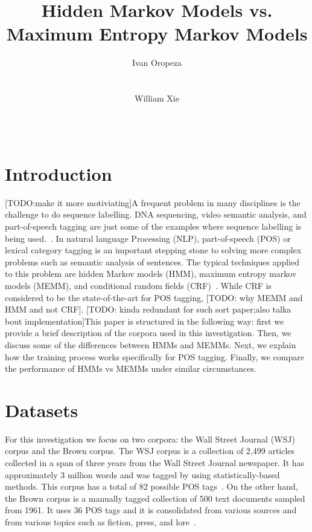 \documentclass{acm_proc_article-sp}
\begin{document}
\author{
\alignauthor
Ivan Oropeza\\
       \\
       \\
\alignauthor
William Xie\\
       \\
       \\
}

\title{Hidden Markov Models vs. Maximum Entropy Markov Models}


\maketitle
\section{Introduction}
[TODO:make it more motiviating]A frequent problem in many disciplines is the challenge to do sequence labelling. DNA sequencing, video semantic analysis, and part-of-speech tagging are just some of the examples where sequence labelling is being used.~\cite{dnaEx, videoEx, nlpEx}. In natural language Processing (NLP), part-of-speech (POS) or lexical category tagging is an important stepping stone to solving more complex problems such as semantic analysis of sentences. The typical techniques applied to this problem are hidden Markov models (HMM), maximum entropy markov models (MEMM), and conditional random fields (CRF)~\cite{nlpBook}. While CRF is considered to be the state-of-the-art for POS tagging, [TODO: why MEMM and HMM and not CRF]. [TODO: kinda redundant for such sort paper;also talka bout implementation]This paper is structured in the following way: first we provide a brief description of the corpora used in this investigation. Then, we discuss some of the differences between HMMs and MEMMs. Next, we explain how the training process works specifically for POS tagging. Finally, we compare the performance of HMMs vs MEMMs under similar circumstances.

\section{Datasets}
For this investigation we focus on two corpora: the Wall Street Journal (WSJ) corpus and the Brown corpus. The WSJ corpus is a collection of 2,499 articles collected in a span of three years from the Wall Street Journal newspaper. It has approximately 3 million words and was tagged by using statistically-based methods. This corpus has a total of 82 possible POS tags~\cite{wsjCorpus}. On the other hand, the Brown corpus is a manually tagged collection of 500 text documents sampled from 1961. It uses 36 POS tags and it is consolidated from various sources and from various topics such as fiction, press, and lore~\cite{brownCorpus}. 
\end{document}
